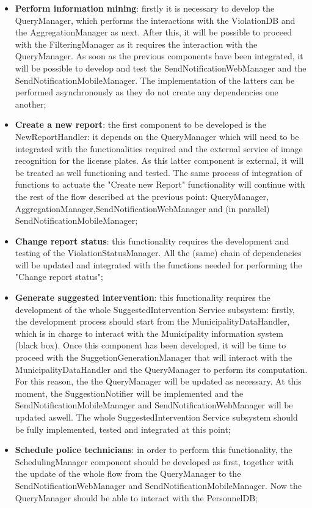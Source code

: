 \begin{itemize}
    \item \textbf{Perform information mining}: firstly it is necessary to develop the QueryManager, which performs the interactions with the ViolationDB and the AggregationManager as next. After this, it will be possible to proceed with the FilteringManager as it requires the interaction with the QueryManager. As soon as the previous components have been integrated, it will be possible to develop and test the
     SendNotificationWebManager and the SendNotificationMobileManager. The implementation of the latters can be performed asynchronously as they do not create any dependencies one another; 
    \item \textbf{Create a new report}: the first component to be developed is the NewReportHandler: it depends on the QueryManager which will need to be integrated with the functionalities required and the external service of image recognition for the license plates. As this latter component is external, it will be treated as well functioning and tested. The same process of integration of functions to actuate the "Create new Report" functionality will continue with the rest of the flow described at the previous point: QueryManager, AggregationManager,SendNotificationWebManager and (in parallel) SendNotificationMobileManager;
    \item \textbf{Change report status}: this functionality requires the development and testing of the ViolationStatusManager. All the (same) chain of dependencies will be updated and integrated with the functions needed for performing the "Change report status";
    \item \textbf{Generate suggested intervention}: this functionality requires the development of the whole SuggestedIntervention Service subsystem: firstly, the development process should start from the MunicipalityDataHandler, which is in charge to interact with the Municipality information system (black box). Once this component has been developed, it will be time to proceed with the SuggetionGenerationManager that will interact with the MunicipalityDataHandler and the QueryManager to perform its computation. For this reason, the the QueryManager will be updated as necessary. At this moment, the SuggestionNotifier will be implemented and the SendNotificationMobileManager and SendNotificationWebManager will be updated aswell. The whole SuggestedIntervention Service subsystem should be fully implemented, tested and integrated at this point;
    \item \textbf{Schedule police technicians}: in order to perform this functionality, the SchedulingManager component should be developed as first, together with the update of the whole flow from the QueryManager to the SendNotificationWebManager and SendNotificationMobileManager. Now the QueryManager should be able to interact with the PersonnelDB;

\end{itemize}

